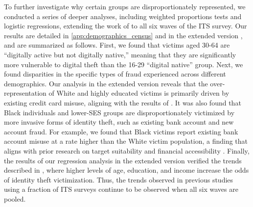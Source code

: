 To further investigate why certain groups are disproportionately represented, we conducted a series of deeper analyses, including weighted proportions tests and logistic regressions, extending the work of \cite{Reynolds2021Differential, DeLiema2021} to all six waves of the ITS survey. Our results are detailed in \ref{app:demographics_census} and in the extended version \cite{Anonymous2026SocialCostExtended}, and are summarized as follows. First, we found that victims aged 30-64 are ``digitally active but not digitally native,'' meaning that they are significantly more vulnerable to digital theft than the 16-29 ``digital native'' group. Next, we found disparities in the specific types of fraud experienced across different demographics. Our analysis in the extended version \cite{Anonymous2026SocialCostExtended} reveals that the over-representation of White and highly educated victims is primarily driven by existing credit card misuse, aligning with the results of \cite{Nevin2025, Copes2010}. It was also found that Black individuals and lower-SES groups are disproportionately victimized by more invasive forms of identity theft, such as existing bank account and new account fraud. For example, we found that Black victims report existing bank account misuse at a rate higher than the White victim population, a finding that aligns with prior research on target suitability and financial accessibility \cite{Copes2010}. Finally, the results of our regression analysis in the extended version \cite{Anonymous2026SocialCostExtended} verified the trends described in \cite{Reynolds2021Differential}, where higher levels of age, education, and income increase the odds of identity theft victimization. Thus, the trends observed in previous studies using a fraction of ITS surveys continue to be observed when all six waves are pooled.

